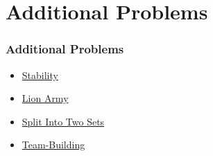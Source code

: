 \section{Additional Problems}

\begin{frame}
\frametitle{Additional Problems}
\begin{itemize}
    \item \href{https://codeforces.com/group/rn8uJP8lA7/contest/511310}{Stability}
    \item \href{https://programming.in.th/tasks/codecube_224}{Lion Army}
    \item \href{https://codeforces.com/contest/1702/problem/E}{Split Into Two Sets}
    \item \href{https://codeforces.com/contest/1444/problem/C}{Team-Building}
\end{itemize}
\end{frame}